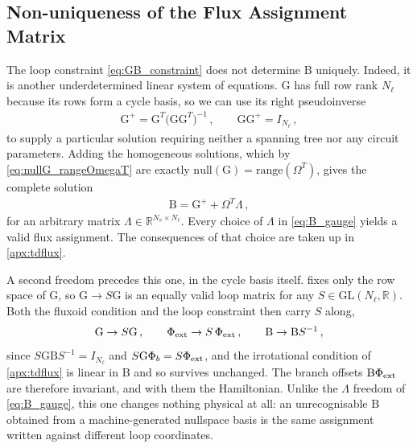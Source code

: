 \documentclass[10pt,aps,pra,onecolumn,superscriptaddress,floatfix,nofootinbib]{revtex4-2}
\begin{document}
\subsection{Non-uniqueness of the Flux Assignment Matrix}

The loop constraint \cref{eq:GB_constraint} does not determine $\mathrm{B}$ uniquely.
Indeed, it is another underdetermined linear system of equations.
$\mathrm{G}$ has full row rank $N_\ell$ because its rows form a cycle basis, so we can use its right pseudoinverse
\begin{align}
    \mathrm{G}^{+} = \mathrm{G}^T\big(\mathrm{G}\mathrm{G}^T\big)^{-1} \, , \qquad \mathrm{G}\mathrm{G}^{+} = I_{N_\ell} \, ,
    \label{eq:G_right_inverse}
\end{align}
to supply a particular solution requiring neither a spanning tree nor any circuit parameters.
Adding the homogeneous solutions, which by \cref{eq:nullG_rangeOmegaT} are exactly $\mathrm{null}(\mathrm{G}) = \mathrm{range}(\Omega^T)$, gives the complete solution
\begin{align}
    \mathrm{B} = \mathrm{G}^{+} + \Omega^T\Lambda \, ,
    \label{eq:B_gauge}
\end{align}
for an arbitrary matrix $\Lambda \in \mathbb{R}^{N_v\times N_\ell}$.
Every choice of $\Lambda$ in \cref{eq:B_gauge} yields a valid flux assignment.
The consequences of that choice are taken up in \cref{apx:tdflux}.

A second freedom precedes this one, in the cycle basis itself.
 fixes only the row space of $\mathrm{G}$, so $\mathrm{G} \to S\mathrm{G}$ is an equally valid loop matrix for any $S \in \mathrm{GL}(N_\ell,\mathbb{R})$.
Both the fluxoid condition and the loop constraint then carry $S$ along,
\begin{align}
    \mathrm{G} \to S\mathrm{G} \, , \qquad
    \Phi_{\rm ext} \to S\,\Phi_{\rm ext} \, , \qquad
    \mathrm{B} \to \mathrm{B}S^{-1} \, ,
    \label{eq:G_basis_change}
\end{align}
since $S\mathrm{G}\mathrm{B}S^{-1} = I_{N_\ell}$ and $S\mathrm{G}\Phi_b = S\Phi_{\rm ext}$, and the irrotational condition of \cref{apx:tdflux} is linear in $\mathrm{B}$ and so survives unchanged.
The branch offsets $\mathrm{B}\Phi_{\rm ext}$ are therefore invariant, and with them the Hamiltonian.
Unlike the $\Lambda$ freedom of \cref{eq:B_gauge}, this one changes nothing physical at all: an unrecognisable $\mathrm{B}$ obtained from a machine-generated nullspace basis is the same assignment written against different loop coordinates.
\end{document}
